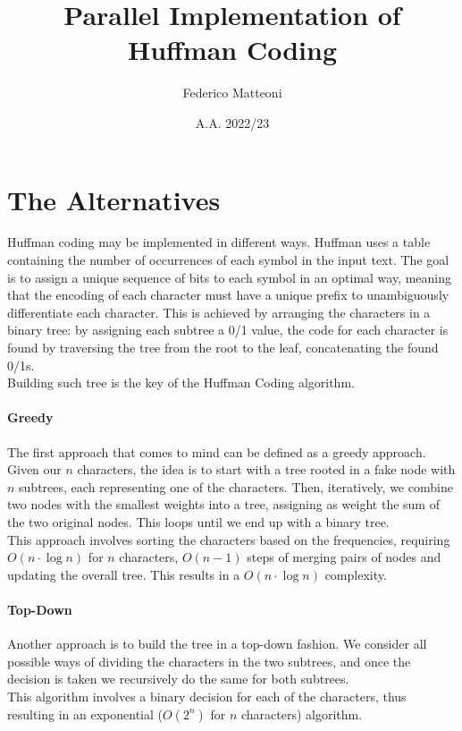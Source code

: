 \documentclass[10pt]{article}
\begin{document}
\title{Parallel Implementation of Huffman Coding}
\author{Federico Matteoni}
\date{A.A. 2022/23}
\maketitle

\section{The Alternatives}
Huffman coding may be implemented in different ways. Huffman uses a table containing the number of occurrences of each symbol in the input text. The goal is to assign a unique sequence of bits to each symbol in an optimal way, meaning that the encoding of each character must have a unique prefix to unambiguously differentiate each character. This is achieved by arranging the characters in a binary tree: by assigning each subtree a 0/1 value, the code for each character is found by traversing the tree from the root to the leaf, concatenating the found 0/1s.\\
Building such tree is the key of the Huffman Coding algorithm.
\paragraph{Greedy} The first approach that comes to mind can be defined as a greedy approach. Given our $n$ characters, the idea is to start with a tree rooted in a fake node with $n$ subtrees, each representing one of the characters. Then, iteratively, we combine two nodes with the smallest weights into a tree, assigning as weight the sum of the two original nodes. This loops until we end up with a binary tree.\\
This approach involves sorting the characters based on the frequencies, requiring $O(n\cdot\log n)$ for $n$ characters, $O(n-1)$ steps of merging pairs of nodes and updating the overall tree. This results in a $O(n\cdot\log n)$ complexity.
\paragraph{Top-Down} Another approach is to build the tree in a top-down fashion. We consider all possible ways of dividing the characters in the two subtrees, and once the decision is taken we recursively do the same for both subtrees.\\
This algorithm involves a binary decision for each of the characters, thus resulting in an exponential ($O(2^n)$ for $n$ characters) algorithm.
\end{document}
